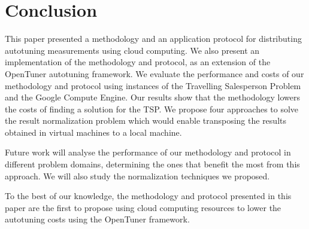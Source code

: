 \section{Conclusion} \label{sec:conclusion}

This paper presented a methodology and an application protocol for distributing
autotuning measurements using cloud computing. We also present an
implementation of the methodology and protocol, as an extension of the
OpenTuner autotuning framework.  We evaluate the performance and costs of our
methodology and protocol using instances of the Travelling Salesperson Problem
and the Google Compute Engine.
Our results show that the methodology lowers the costs of finding a solution
for the TSP.
We propose four approaches to solve the result normalization problem which
would enable transposing the results obtained in virtual machines to a local
machine.

Future work will analyse the performance of our methodology and protocol in
different problem domains, determining the ones that benefit the most from
this approach. We will also study the normalization techniques we proposed.

To the best of our knowledge, the methodology and protocol presented in this
paper are the first to propose using cloud computing resources to lower the
autotuning costs using the OpenTuner framework.
